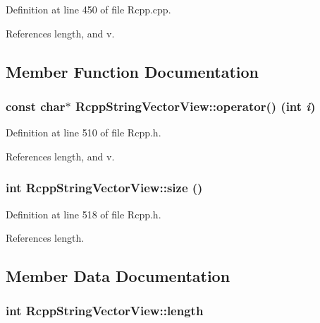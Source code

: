 Definition at line 450 of file Rcpp.cpp.

References length, and v.

\subsection{Member Function Documentation}
\hypertarget{classRcppStringVectorView_b81899b7d6c595f84d2fb07809ff002c}{
\subsubsection[{operator()}]{\setlength{\rightskip}{0pt plus 5cm}const char$\ast$ RcppStringVectorView::operator() (int {\em i})}}
\label{classRcppStringVectorView_b81899b7d6c595f84d2fb07809ff002c}




Definition at line 510 of file Rcpp.h.

References length, and v.\hypertarget{classRcppStringVectorView_df0f6b6541339ca747c4ed79c445869e}{
\subsubsection[{size}]{\setlength{\rightskip}{0pt plus 5cm}int RcppStringVectorView::size ()}}
\label{classRcppStringVectorView_df0f6b6541339ca747c4ed79c445869e}




Definition at line 518 of file Rcpp.h.

References length.

\subsection{Member Data Documentation}
\hypertarget{classRcppStringVectorView_ef6edaa52c234b4bb1fd1fc949fa0f25}{
\subsubsection[{length}]{\setlength{\rightskip}{0pt plus 5cm}int {\bf RcppStringVectorView::length}}}
\label{classRcppStringVectorView_ef6edaa52c234b4bb1fd1fc949fa0f25}




